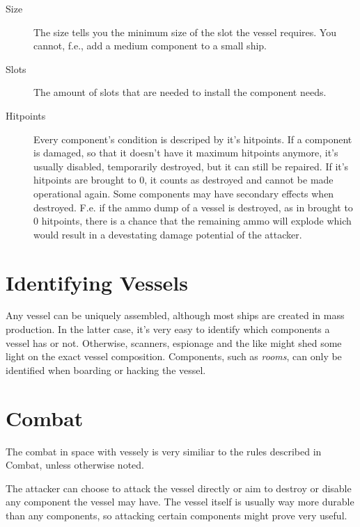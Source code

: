 \begin{description}
  \item[Size] The size tells you the minimum size of the slot the vessel requires. You cannot, f.e., add a medium component to a small ship.
  \item[Slots] The amount of slots that are needed to install the component needs.
  \item[Hitpoints] Every component's condition is descriped by it's hitpoints. If a component is damaged, so that it doesn't have it maximum hitpoints anymore, it's usually disabled, temporarily destroyed, but it can still be repaired. If it's hitpoints are brought to 0, it counts as destroyed and cannot be made operational again. Some components may have secondary effects when destroyed. F.e. if the ammo dump of a vessel is destroyed, as in brought to 0 hitpoints, there is a chance that the remaining ammo will explode which would result in a devestating damage potential of the attacker.
\end{description}


\section{Identifying Vessels}
\label{sec:Vessels-Identifying Vessels}

Any vessel can be uniquely assembled, although most ships are created in mass production. In the latter case, it's very easy to identify which components a vessel has or not. Otherwise, scanners, espionage and the like might shed some light on the exact vessel composition. Components, such as \emph{rooms}, can only be identified when boarding or hacking the vessel.

\section{Combat}
\label{sec:Vessels-Combat}

The combat in space with vessely is very similiar to the rules described in Combat, unless otherwise noted.

The attacker can choose to attack the vessel directly or aim to destroy or disable any component the vessel may have. The vessel itself is usually way more durable than any components, so attacking certain components might prove very useful.
